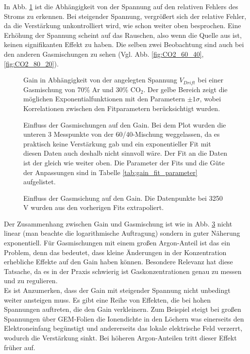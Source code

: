 In Abb. \ref{fig:7030Vdrift} ist die Abhängigkeit von der Spannung auf den relativen Fehlers des Stroms zu erkennen. Bei steigender Spannung, vergrößert sich der relative Fehler, da die Verstärkung unkontrolliert wird, wie schon weiter oben besprochen. Eine Erhöhung der Spannung scheint auf das Rauschen, also wenn die Quelle aus ist, keinen signifikanten Effekt zu haben. Die selben zwei Beobachtung sind auch bei den anderen Gasmischungen zu sehen (Vgl. Abb. \ref{fig:CO2_60_40},\ref{fig:CO2_80_20}). 


\begin{figure}[H]
    \centering
    
    \caption{Gain in Abhängigkeit von der angelegten Spannung $V_{Drift}$ bei einer Gasmischung von 70\% Ar und 30\% $\text{CO}_2$. Der gelbe Bereich zeigt die möglichen Exponentialfunktionen mit den Parametern $\pm 1 \sigma$, wobei Korrelationen zwischen den Fitparametern berücksichtigt wurden.}
    \label{fig:7030Vdrift}
\end{figure}

\begin{figure}[H]
    \centering
    
    \caption{Einfluss der Gasmischungen auf den Gain. Bei dem Plot wurden die unteren 3 Messpunkte von der 60/40-Mischung weggelassen, da es praktisch keine Verstärkung gab und ein exponentieller Fit mit diesen Daten auch deshalb nicht sinnvoll wäre. Der Fit an die Daten ist der gleich wie weiter oben. Die Parameter der Fits und die Güte der Anpassungen sind in Tabelle \ref{tab:gain_fit_parameter} aufgelistet.}
    \label{fig:Vdriftalle}
\end{figure}

\begin{figure}[H]
    \centering
    
    \caption{Einfluss der Gasmsichung auf den Gain. Die Datenpunkte bei 3250 V wurden aus den vorherigen Fits extrapoliert. }
    \label{fig:Vergleich_Gemisch}   
\end{figure}
Der Zusammenhang zwischen Gain und Gasmischung ist wie in Abb. \ref{fig:Vergleich_Gemisch} nicht linear (man beachte die logarithmische Auftragung) sondern in guter Näherung exponentiell. Für Gasmischungen mit einem großen Argon-Anteil ist das ein Problem, denn das bedeutet, dass kleine Änderungen in der Konzentration erhebliche Effekte auf den Gain haben können. Besondere Relevanz hat diese Tatsache, da es in der Praxis schwierig ist Gaskonzentrationen genau zu messen und zu regulieren.\\
Es ist Anzumerken, dass der Gain mit steigender Spannung nicht unbedingt weiter ansteigen muss. Es gibt eine Reihe von Effekten, die bei hohen Spannungen auftreten, die den Gain verkleinern. Zum Beispiel steigt bei großen Spannungen über GEM-Folien die Ionendichte in den Löchern was einerseits den Elektroneinfang begünstigt und andererseits das lokale elektrische Feld verzerrt, wodurch die Verstärkung sinkt. Bei höheren Argon-Anteilen tritt dieser Effekt früher auf.  

